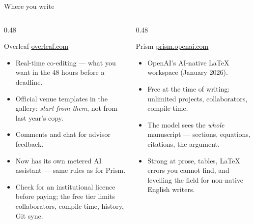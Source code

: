 \documentclass[aspectratio=169,11pt]{beamer}
\newcommand{\lnk}[2]{\href{#1}{\color{brandlight}\underline{#2}}}
\begin{document}
\begin{frame}{Where you write}
\begin{columns}[T]
\begin{column}{0.48\textwidth}
\begin{block}{Overleaf \quad\footnotesize\lnk{https://www.overleaf.com}{overleaf.com}}
\footnotesize
\begin{itemize}
  \item Real-time co-editing --- what you want in the 48 hours before a
        deadline.
  \item Official venue templates in the gallery: \emph{start from them}, not
        from last year's copy.
  \item Comments and chat for advisor feedback.
  \item Now has its own metered AI assistant --- same rules as for Prism.
  \item Check for an institutional licence before paying; the free tier limits
        collaborators, compile time, history, Git sync.
\end{itemize}
\end{block}
\end{column}
\begin{column}{0.48\textwidth}
\begin{block}{Prism \quad\footnotesize\lnk{https://prism.openai.com}{prism.openai.com}}
\footnotesize
\begin{itemize}
  \item OpenAI's AI-native LaTeX workspace (January 2026).
  \item Free at the time of writing: unlimited projects, collaborators, compile
        time.
  \item The model sees the \emph{whole} manuscript --- sections, equations,
        citations, the argument.
  \item Strong at prose, tables, LaTeX errors you cannot find, and levelling
        the field for non-native English writers.
\end{itemize}
\end{block}
\end{column}
\end{columns}
\end{frame}
\end{document}
